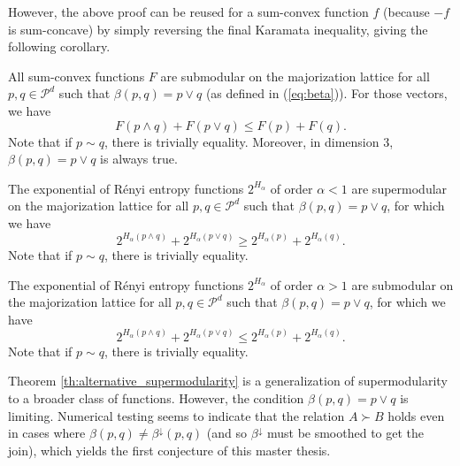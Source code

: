 However, the above proof can be reused for a sum-convex function $f$ (because $-f$ is sum-concave) by simply reversing the final Karamata inequality, giving the following corollary.

\begin{corollary} \label{cor:submodularity_sum-convex}
    All sum-convex functions $F$ are submodular on the majorization lattice for all $p, q \in \mathcal{P}^d$ such that $\beta(p, q) = p \vee q$ (as defined in (\ref{eq:beta})). For those vectors, we have
    \begin{equation} \label{eq:submodularity}
        F(p \wedge q) + F(p \vee q) \leq F(p) + F(q).
    \end{equation}
    Note that if $p \sim q$, there is trivially equality. Moreover, in dimension 3, $\beta(p, q) = p \vee q$ is always true.
\end{corollary}

\begin{corollary} \label{cor:renyi_leq_1}
    The exponential of Rényi entropy functions $2^{H_\alpha}$ of order $\alpha < 1$ are supermodular on the majorization lattice for all $p, q \in \mathcal{P}^d$ such that $\beta(p, q) = p \vee q$, for which we have
    \begin{equation} \label{eq:supermodularity_renyi}
        2^{H_\alpha(p \wedge q)} + 2^{H_\alpha(p \vee q)} \geq 2^{H_\alpha(p)} + 2^{H_\alpha(q)}.
    \end{equation}
    Note that if $p \sim q$, there is trivially equality.
\end{corollary}

\begin{corollary} \label{cor:renyi_geq_1}
    The exponential of Rényi entropy functions $2^{H_\alpha}$  of order $\alpha > 1$ are submodular on the majorization lattice for all $p, q \in \mathcal{P}^d$ such that $\beta(p, q) = p \vee q$, for which we have
    \begin{equation} \label{eq:submodularity_renyi}
        2^{H_\alpha(p \wedge q)} + 2^{H_\alpha(p \vee q)} \leq 2^{H_\alpha(p)} + 2^{H_\alpha(q)}.
    \end{equation}
    Note that if $p \sim q$, there is trivially equality.
\end{corollary}

\noindent Theorem \ref{th:alternative_supermodularity} is a generalization of supermodularity to a broader class of functions. However, the condition $\beta(p, q) = p \vee q$ is limiting. Numerical testing seems to indicate that the relation $A \succ B$ holds even in cases where $\beta(p, q) \neq \beta^\downarrow(p, q)$ (and so $\beta^\downarrow$ must be smoothed to get the join), which yields the first conjecture of this master thesis.

